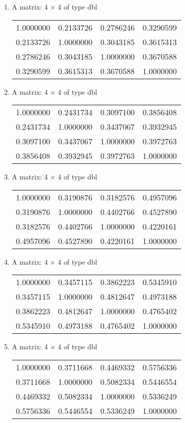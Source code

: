 \documentclass[11pt]{article}
\begin{document}
\begin{enumerate}
\item A matrix: 4 × 4 of type dbl
\begin{tabular}{llll}
	 1.0000000 & 0.2133726 & 0.2786246 & 0.3290599\\
	 0.2133726 & 1.0000000 & 0.3043185 & 0.3615313\\
	 0.2786246 & 0.3043185 & 1.0000000 & 0.3670588\\
	 0.3290599 & 0.3615313 & 0.3670588 & 1.0000000\\
\end{tabular}

\item A matrix: 4 × 4 of type dbl
\begin{tabular}{llll}
	 1.0000000 & 0.2431734 & 0.3097100 & 0.3856408\\
	 0.2431734 & 1.0000000 & 0.3437067 & 0.3932945\\
	 0.3097100 & 0.3437067 & 1.0000000 & 0.3972763\\
	 0.3856408 & 0.3932945 & 0.3972763 & 1.0000000\\
\end{tabular}

\item A matrix: 4 × 4 of type dbl
\begin{tabular}{llll}
	 1.0000000 & 0.3190876 & 0.3182576 & 0.4957096\\
	 0.3190876 & 1.0000000 & 0.4402766 & 0.4527890\\
	 0.3182576 & 0.4402766 & 1.0000000 & 0.4220161\\
	 0.4957096 & 0.4527890 & 0.4220161 & 1.0000000\\
\end{tabular}

\item A matrix: 4 × 4 of type dbl
\begin{tabular}{llll}
	 1.0000000 & 0.3457115 & 0.3862223 & 0.5345910\\
	 0.3457115 & 1.0000000 & 0.4812647 & 0.4973188\\
	 0.3862223 & 0.4812647 & 1.0000000 & 0.4765402\\
	 0.5345910 & 0.4973188 & 0.4765402 & 1.0000000\\
\end{tabular}

\item A matrix: 4 × 4 of type dbl
\begin{tabular}{llll}
	 1.0000000 & 0.3711668 & 0.4469332 & 0.5756336\\
	 0.3711668 & 1.0000000 & 0.5082334 & 0.5446554\\
	 0.4469332 & 0.5082334 & 1.0000000 & 0.5336249\\
	 0.5756336 & 0.5446554 & 0.5336249 & 1.0000000\\
\end{tabular}

\end{enumerate}
\end{document}
